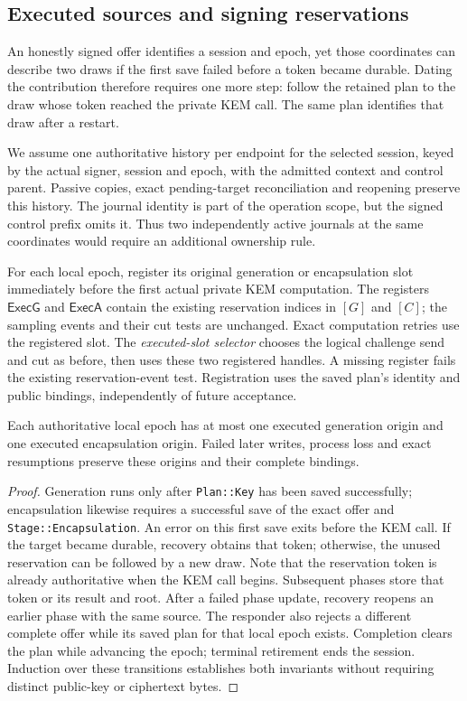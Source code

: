 \subsection{Executed sources and signing reservations}
\label{sec:executed-source-attribution}

An honestly signed offer identifies a session and epoch, yet those
coordinates can describe two draws if the first save failed before a
token became durable. Dating the contribution therefore requires one
more step: follow the retained plan to the draw whose token reached
the private KEM call. The same plan identifies that draw after a restart.

We assume one authoritative history per endpoint for the selected session,
keyed by the actual signer, session and epoch, with the admitted context
and control parent. Passive copies, exact pending-target reconciliation
and reopening preserve this history. The journal identity is part of the
operation scope, but the signed control prefix omits it. Thus two independently
active journals at the same coordinates would require an additional
ownership rule.

For each local epoch, register its original generation or encapsulation
slot immediately before the first actual private KEM computation. The
registers $\mathsf{ExecG}$ and $\mathsf{ExecA}$ contain the existing
reservation indices in $[G]$ and $[C]$; the sampling events and their cut
tests are unchanged. Exact computation retries use the registered slot.
The \emph{executed-slot selector} chooses the logical challenge send and
cut as before, then uses these two registered handles. A missing register
fails the existing reservation-event test. Registration uses the saved
plan's identity and public bindings, independently of future acceptance.

\begin{lemma}
\label{lem:executed-slot-stability}
Each authoritative local epoch has at most one executed generation origin
and one executed encapsulation origin. Failed later writes, process loss
and exact resumptions preserve these origins and their complete bindings.
\end{lemma}
\begin{proof}
Generation runs only after \texttt{Plan::Key} has been saved successfully;
encapsulation likewise requires a successful save of the exact offer and
\texttt{Stage::Encapsulation}. An error on this first save
exits before the KEM call. If the target became durable, recovery obtains
that token; otherwise, the unused reservation can be followed by a new
draw. Note that the reservation token is already authoritative when the
KEM call begins. Subsequent phases store that token or its result and
root. After a failed phase update, recovery reopens an earlier phase
with the same source. The responder also rejects a different complete
offer while its saved plan for that local epoch exists. Completion clears
the plan while advancing the epoch; terminal retirement ends the session.
Induction over these transitions
establishes both invariants without requiring distinct public-key or
ciphertext bytes.
\end{proof}


